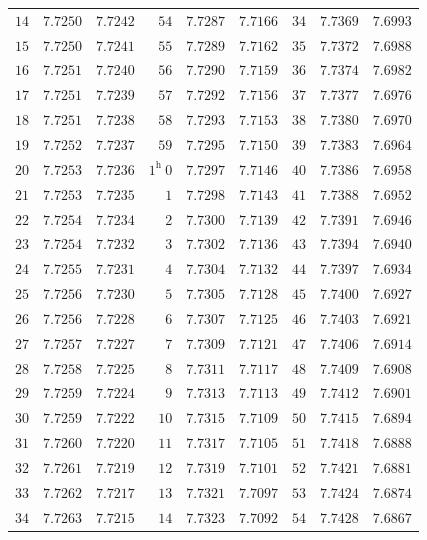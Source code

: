 \begin{center}
{{\begin{minipage}{.83\linewidth}
\begin{tabular}{r|r|r||r|r|r||r|r|r}
$14$ & $7.7250$ & $7.7242$ & $54$ & $7.7287$ & $7.7166$ & $34$ & $7.7369$ & $7.6993$\\
$15$ & $7.7250$ & $7.7241$ & $55$ & $7.7289$ & $7.7162$ & $35$ & $7.7372$ & $7.6988$\\[1.15pt]
$16$ & $7.7251$ & $7.7240$ & $56$ & $7.7290$ & $7.7159$ & $36$ & $7.7374$ & $7.6982$\\
$17$ & $7.7251$ & $7.7239$ & $57$ & $7.7292$ & $7.7156$ & $37$ & $7.7377$ & $7.6976$\\
$18$ & $7.7251$ & $7.7238$ & $58$ & $7.7293$ & $7.7153$ & $38$ & $7.7380$ & $7.6970$\\
$19$ & $7.7252$ & $7.7237$ & $59$ & $7.7295$ & $7.7150$ & $39$ & $7.7383$ & $7.6964$\\
$20$ & $7.7253$ & $7.7236$ & $1^{\mathrm h}\ 0$ & $7.7297$ & $7.7146$ & $40$ & $7.7386$ & $7.6958$\\[1.15pt]
$21$ & $7.7253$ & $7.7235$ & $1$ & $7.7298$ & $7.7143$ & $41$ & $7.7388$ & $7.6952$\\
$22$ & $7.7254$ & $7.7234$ & $2$ & $7.7300$ & $7.7139$ & $42$ & $7.7391$ & $7.6946$\\
$23$ & $7.7254$ & $7.7232$ & $3$ & $7.7302$ & $7.7136$ & $43$ & $7.7394$ & $7.6940$\\
$24$ & $7.7255$ & $7.7231$ & $4$ & $7.7304$ & $7.7132$ & $44$ & $7.7397$ & $7.6934$\\
$25$ & $7.7256$ & $7.7230$ & $5$ & $7.7305$ & $7.7128$ & $45$ & $7.7400$ & $7.6927$\\[1.15pt]
$26$ & $7.7256$ & $7.7228$ & $6$ & $7.7307$ & $7.7125$ & $46$ & $7.7403$ & $7.6921$\\
$27$ & $7.7257$ & $7.7227$ & $7$ & $7.7309$ & $7.7121$ & $47$ & $7.7406$ & $7.6914$\\
$28$ & $7.7258$ & $7.7225$ & $8$ & $7.7311$ & $7.7117$ & $48$ & $7.7409$ & $7.6908$\\
$29$ & $7.7259$ & $7.7224$ & $9$ & $7.7313$ & $7.7113$ & $49$ & $7.7412$ & $7.6901$\\
$30$ & $7.7259$ & $7.7222$ & $10$ & $7.7315$ & $7.7109$ & $50$ & $7.7415$ & $7.6894$\\[1.15pt]
$31$ & $7.7260$ & $7.7220$ & $11$ & $7.7317$ & $7.7105$ & $51$ & $7.7418$ & $7.6888$\\
$32$ & $7.7261$ & $7.7219$ & $12$ & $7.7319$ & $7.7101$ & $52$ & $7.7421$ & $7.6881$\\
$33$ & $7.7262$ & $7.7217$ & $13$ & $7.7321$ & $7.7097$ & $53$ & $7.7424$ & $7.6874$\\
$34$ & $7.7263$ & $7.7215$ & $14$ & $7.7323$ & $7.7092$ & $54$ & $7.7428$ & $7.6867$\\

\end{tabular}
\end{minipage}}}
\end{center}
